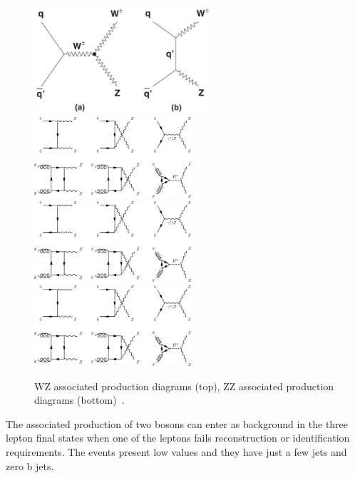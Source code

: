 \begin{figure}[h!]
\centering
  \includegraphics[clip,trim=0.cm 0.5cm 0cm 0cm, height =4cm]{Figures/c4/dia/wz.jpeg}\\
  \includegraphics[clip,trim=0.cm 6cm 15cm 0cm, height =
  3cm]{Figures/c4/dia/Lowest-order-Feynman-diagrams-for-ZZ-production.jpeg}
\includegraphics[clip,trim=0.cm 0.cm 15cm 6.5cm, height =3cm]{Figures/c4/dia/Lowest-order-Feynman-diagrams-for-ZZ-production.jpeg}
  \includegraphics[clip,trim=15.cm 6.cm 0cm 0cm, height = 3cm]{Figures/c4/dia/Lowest-order-Feynman-diagrams-for-ZZ-production.jpeg}
  \caption{WZ associated production diagrams (top), ZZ associated
    production diagrams (bottom)~\cite{diagram}.}
  \label{fig:c41}
\end{figure}
The associated production of two \PZ bosons can enter as background in
the three lepton final states when one of the leptons fails
reconstruction or identification requirements. The events present low \ptmiss
values and they have just a few jets and zero b jets. 

